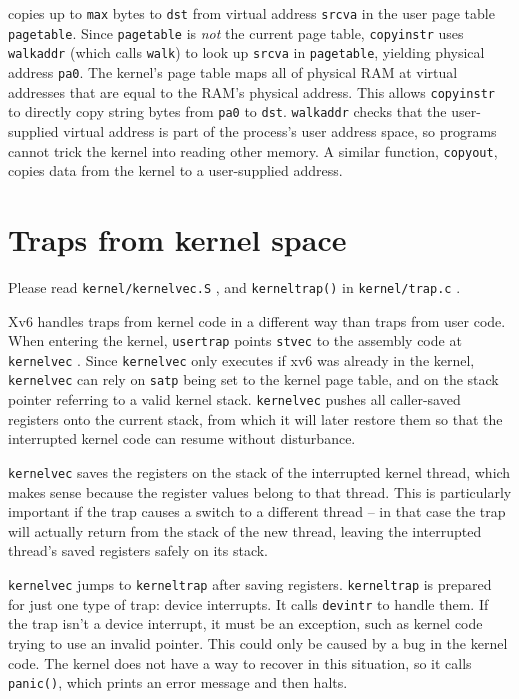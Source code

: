 copies up to \lstinline{max} bytes to
\lstinline{dst} from virtual address \lstinline{srcva} in the user page
table \lstinline{pagetable}.
Since \lstinline{pagetable} is {\it not} the current page
table,
\lstinline{copyinstr} uses {\tt walkaddr}
(which calls {\tt walk}) to look up
\lstinline{srcva} in
\lstinline{pagetable}, yielding
physical address \lstinline{pa0}.
The kernel's page table maps all of physical RAM 
at virtual addresses that are equal to the RAM's physical address.
This allows
{\tt copyinstr} to directly copy string bytes from {\tt pa0} to {\tt dst}.
{\tt walkaddr} 
checks that the user-supplied virtual address is part of
the process's user address space, so programs
cannot trick the kernel into reading other memory.
A similar function, {\tt copyout}, copies data from the
kernel to a user-supplied address.

\section{Traps from kernel space}
\label{s:ktraps}

Please read \lstinline{kernel/kernelvec.S} ,
and {\tt kerneltrap()} in \lstinline{kernel/trap.c} .

Xv6 handles traps from kernel code in a different way
than traps from user code.
When entering the kernel, {\tt usertrap} points {\tt stvec}
to the assembly code at {\tt kernelvec}
.
Since {\tt kernelvec} only executes if
xv6 was already in the kernel, {\tt kernelvec} can rely
on {\tt satp} being set to the kernel page table, and on the
stack pointer referring to a valid kernel stack.
{\tt kernelvec} pushes all caller-saved registers onto the current stack,
from which it will later restore them
so that the interrupted
kernel code can resume without disturbance.

{\tt kernelvec} saves the registers on the stack of the interrupted
kernel thread, which makes sense because the register values belong to
that thread. This is particularly important if the trap causes a
switch to a different thread -- in that case the trap will actually
return from the stack of the new thread, leaving the interrupted
thread's saved registers safely on its stack.

{\tt kernelvec} jumps to {\tt kerneltrap}
 after saving registers.
{\tt kerneltrap} is prepared for just one type of trap:
device interrupts. It calls
{\tt devintr}
to handle them.
If the trap isn't a device interrupt, it must be an exception,
such as kernel code trying to use an invalid pointer.
This could only be caused by a bug in the kernel code.
The kernel does not have a way to recover in this situation,
so it calls {\tt panic()}, which prints an error message
and then halts.

